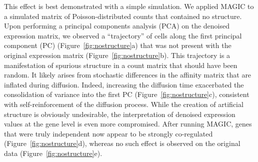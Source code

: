 \documentclass[10pt,letterpaper]{article}
\begin{document}
This effect is best demonstrated with a simple simulation.
We applied MAGIC to a simulated matrix of Poisson-distributed counts that contained no structure.
Upon performing a principal components analysis (PCA) on the denoised expression matrix, we observed a ``trajectory'' of cells along the first principal component (PC) (Figure~\ref{fig:nostructure}a) that was not present with the original expression matrix (Figure~\ref{fig:nostructure}b).
This trajectory is a manifestation of spurious structure in a count matrix that should have been random.
It likely arises from stochastic differences in the affinity matrix that are inflated during diffusion.
Indeed, increasing the diffusion time exacerbated the consolidation of variance into the first PC (Figure~\ref{fig:nostructure}c), consistent with self-reinforcement of the diffusion process.
While the creation of artificial structure is obviously undesirable, the interpretation of denoised expression values at the gene level is even more compromised.
After running MAGIC, genes that were truly independent now appear to be strongly co-regulated (Figure~\ref{fig:nostructure}d), whereas no such effect is observed on the original data (Figure~\ref{fig:nostructure}e).
\end{document}
